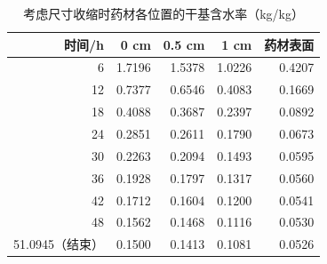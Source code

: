 \begin{table}[htbp]
\centering
\caption{考虑尺寸收缩时药材各位置的干基含水率（kg/kg）}
\label{tab:q4-moisture}
\begin{tabular}{rrrrr}
\toprule
时间/h & 0 cm & 0.5 cm & 1 cm & 药材表面 \\
\midrule
6 & 1.7196 & 1.5378 & 1.0226 & 0.4207 \\
12 & 0.7377 & 0.6546 & 0.4083 & 0.1669 \\
18 & 0.4088 & 0.3687 & 0.2397 & 0.0892 \\
24 & 0.2851 & 0.2611 & 0.1790 & 0.0673 \\
30 & 0.2263 & 0.2094 & 0.1493 & 0.0595 \\
36 & 0.1928 & 0.1797 & 0.1317 & 0.0560 \\
42 & 0.1712 & 0.1604 & 0.1200 & 0.0541 \\
48 & 0.1562 & 0.1468 & 0.1116 & 0.0530 \\
51.0945（结束） & 0.1500 & 0.1413 & 0.1081 & 0.0526 \\
\bottomrule
\end{tabular}
\end{table}
